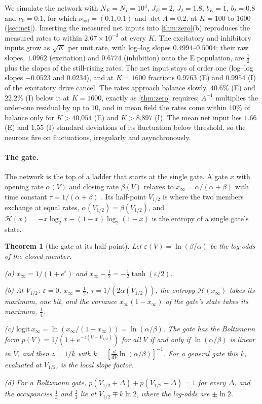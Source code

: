 \documentclass[11pt]{article}
\newtheorem{theorem}{Theorem}
\theoremstyle{definition}\newtheorem{definition}[theorem]{Definition}
\theoremstyle{remark}\newtheorem{remark}[theorem]{Remark}
\begin{document}
We simulate the network with $N_E=N_I=10^4$, $J_E=2$, $J_I=1.8$, $b_E=1$, $b_I=0.8$ and $\nu_0=0.1$, for which $\nu_{\mathrm{bal}}=(0.1,0.1)$ and $\det A=0.2$, at $K=100$ to $1600$ (\cref{sec:net}). Inserting the measured net inputs into \cref{thm:zero}(b) reproduces the measured rates to within $2.67\times10^{-3}$ at every $K$. The excitatory and inhibitory inputs grow as $\sqrt K$ per unit rate, with log--log slopes $0.4994$--$0.5004$; their raw slopes, $1.0962$ (excitation) and $0.6774$ (inhibition) onto the E population, are $\frac12$ plus the slopes of the still-rising rates. The net input stays of order one (log--log slopes $-0.0523$ and $0.0234$), and at $K=1600$ fractions $0.9763$ (E) and $0.9954$ (I) of the excitatory drive cancel. The rates approach balance slowly, $40.6\%$ (E) and $22.2\%$ (I) below it at $K=1600$, exactly as \cref{thm:zero} requires: $A^{-1}$ multiplies the order-one residual by up to $10$, and in mean field the rates come within $10\%$ of balance only for $K>\text{40,054}$ (E) and $K>\text{8,897}$ (I). The mean net input lies $1.66$ (E) and $1.55$ (I) standard deviations of its fluctuation below threshold, so the neurons fire on fluctuations, irregularly and asynchronously.

\paragraph{The gate.} The network is the top of a ladder that starts at the single gate. A gate $x$ with opening rate $\alpha(V)$ and closing rate $\beta(V)$ relaxes to $x_\infty=\alpha/(\alpha+\beta)$ with time constant $\tau=1/(\alpha+\beta)$ \cite{HH}. Its half-point $V_{1/2}$ is where the two members exchange at equal rates, $\alpha(V_{1/2})=\beta(V_{1/2})$, and $\mathcal H(x)=-x\log_2x-(1-x)\log_2(1-x)$ is the entropy of a single gate's state.

\begin{theorem}[the gate at its half-point]\label{thm:half}
Let $\varepsilon(V)=\ln(\beta/\alpha)$ be the log-odds of the closed member.
\par\noindent(a) $x_\infty=1/(1+e^{\varepsilon})$ and $x_\infty-\frac12=-\frac12\tanh(\varepsilon/2)$.
\par\noindent(b) At $V_{1/2}$: $\varepsilon=0$, $x_\infty=\frac12$, $\tau=1/(2\alpha(V_{1/2}))$, the entropy $\mathcal H(x_\infty)$ takes its maximum, one bit, and the variance $x_\infty(1-x_\infty)$ of the gate's state takes its maximum, $\frac14$.
\par\noindent(c) $\mathrm{logit}\,x_\infty=\ln(x_\infty/(1-x_\infty))=\ln(\alpha/\beta)$. The gate has the Boltzmann form $p(V)=1/(1+e^{-z(V-V_{1/2})})$ for all $V$ if and only if $\ln(\alpha/\beta)$ is linear in $V$, and then $z=1/k$ with $k=[\frac{d}{dV}\ln(\alpha/\beta)]^{-1}$. For a general gate this $k$, evaluated at $V_{1/2}$, is the local slope factor.
\par\noindent(d) For a Boltzmann gate, $p(V_{1/2}+\Delta)+p(V_{1/2}-\Delta)=1$ for every $\Delta$, and the occupancies $\frac13$ and $\frac23$ lie at $V_{1/2}\mp k\ln2$, where the log-odds are $\pm\ln2$.
\end{theorem}
\end{document}
